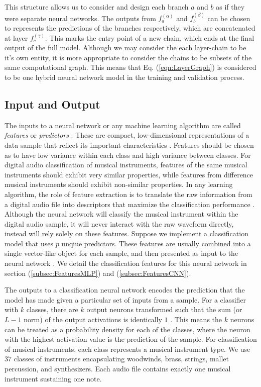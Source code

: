 \documentclass[conference,onecolumn,letterpaper]{IEEEtran}
\begin{document}
This structure allows us to consider and design each branch $a$ and $b$ as if they were separate neural networks. The outputs from $f^{(\alpha)}_a$ and $f^{(\beta)}_b$ can be chosen to represents the predictions of the branches respectively, which are concatenated at layer $f^{(\gamma)}_c$. This marks the entry point of a new chain, which ends at the final output of the full model. Although we may consider the each layer-chain to be it's own entity, it is more appropriate to consider the chains to be subsets of the same computational graph. This means that Eq. (\ref{eqn:LayerGraph}) is considered to be one hybrid neural network model in the training and validation process.


\subsection{Input and Output}
\label{subsec:InputOutput}

The inputs to a neural network or any machine learning algorithm are called \textit{features} or \textit{predictors} \cite{James}. These are compact, low-dimensional representations of a data sample that reflect its important characteristics \cite{Liu}. Features should be chosen as to have low variance within each class and high variance between classes. For digital audio classification of musical instruments, features of the same musical instruments should exhibit very similar properties, while features from difference musical instruments should exhibit non-similar properties. In any learning algorithm, the role of feature extraction is to translate the raw information from a digital audio file into descriptors that maximize the classification performance \cite{Virtanen}. Although the neural network will classify the musical instrument within the digital audio sample, it will never interact with the raw waveform directly, instead will rely solely on these features. Suppose we implement a classification model that uses $p$ unqiue predictors. These features are usually combined into a single vector-like object for each sample, and then presented as input to the neural network \cite{Geron}. We detail the classification features for this neural network in section (\ref{subsec:FeaturesMLP}) and (\ref{subsec:FeaturesCNN}). 

The outputs to a classification neural network encodes the prediction that the model has made given a particular set of inputs from a sample. For a classifier with $k$ classes, there are $k$ output neurons transformed such that the sum (or $L-1$ norm) of the output activations is identically $1$ \cite{Goodfellow,James}. This means the $k$ neurons can be treated as a probability density for each of the classes, where the neuron with the highest activation value is the prediction of the sample. For classification of musical instruments, each class represents a musical instrument type. We use $37$ classes of instruments encapsulating woodwinds, brass, strings, mallet percussion, and synthesizers. Each audio file contains exactly one musical instrument sustaining one note.
\end{document}
